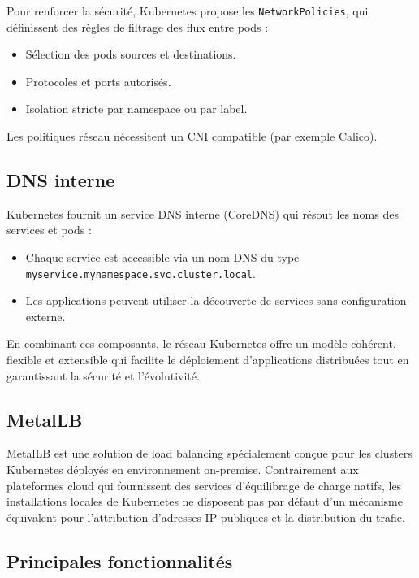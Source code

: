 Pour renforcer la sécurité, Kubernetes propose les \texttt{NetworkPolicies}, qui définissent des règles de filtrage des flux entre pods :
\begin{itemize}
	\item Sélection des pods sources et destinations.
	\item Protocoles et ports autorisés.
	\item Isolation stricte par namespace ou par label.
\end{itemize}
Les politiques réseau nécessitent un CNI compatible (par exemple Calico).

\subsection{DNS interne}

Kubernetes fournit un service DNS interne (CoreDNS) qui résout les noms des services et pods :
\begin{itemize}
	\item Chaque service est accessible via un nom DNS du type \texttt{myservice.mynamespace.svc.cluster.local}.
	\item Les applications peuvent utiliser la découverte de services sans configuration externe.
\end{itemize}

En combinant ces composants, le réseau Kubernetes offre un modèle cohérent, flexible et extensible qui facilite le déploiement d’applications distribuées tout en garantissant la sécurité et l’évolutivité.

\subsection{MetalLB}

MetalLB est une solution de load balancing spécialement conçue pour les clusters Kubernetes déployés en environnement on-premise. Contrairement aux plateformes cloud qui fournissent des services d’équilibrage de charge natifs, les installations locales de Kubernetes ne disposent pas par défaut d’un mécanisme équivalent pour l’attribution d’adresses IP publiques et la distribution du trafic.

\subsection{Principales fonctionnalités}

